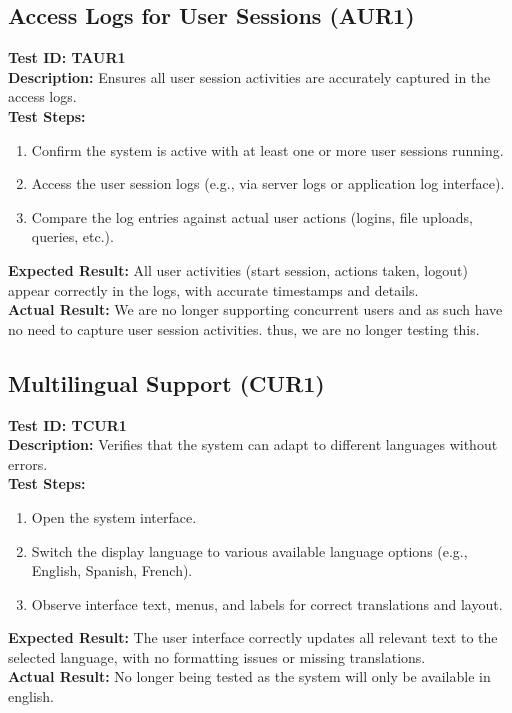 \documentclass[12pt, titlepage]{article}
\begin{document}
\subsection{Access Logs for User Sessions (AUR1)}
\textbf{Test ID: TAUR1}\\
\textbf{Description:} Ensures all user session activities are accurately captured in the access logs.\\
\textbf{Test Steps:}
\begin{enumerate}
    \item Confirm the system is active with at least one or more user sessions running.
    \item Access the user session logs (e.g., via server logs or application log interface).
    \item Compare the log entries against actual user actions (logins, file uploads, queries, etc.).
\end{enumerate}
\textbf{Expected Result:} All user activities (start session, actions taken, logout) appear correctly in the logs, with accurate timestamps and details.\\
\textbf{Actual Result:} We are no longer supporting concurrent users and as such have no need to capture user session activities. thus, we are no longer testing this.

\subsection{Multilingual Support (CUR1)}
\textbf{Test ID: TCUR1}\\
\textbf{Description:} Verifies that the system can adapt to different languages without errors.\\
\textbf{Test Steps:}
\begin{enumerate}
    \item Open the system interface.
    \item Switch the display language to various available language options (e.g., English, Spanish, French).
    \item Observe interface text, menus, and labels for correct translations and layout.
\end{enumerate}
\textbf{Expected Result:} The user interface correctly updates all relevant text to the selected language, with no formatting issues or missing translations.\\
\textbf{Actual Result:} No longer being tested as the system will only be available in english.
\end{document}

